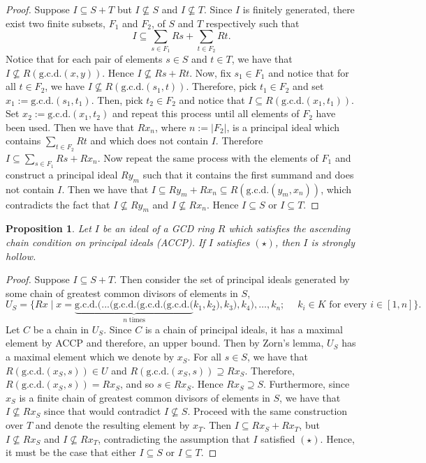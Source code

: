 \documentclass[11pt,english]{amsart}
\newtheorem{proposition}[theorem]{Proposition}
\theoremstyle{definition}
\numberwithin{equation}{section}
\theoremstyle{remark}
\begin{document}
\begin{proof}
    Suppose $I\subseteq S+T$ but $I\not\subseteq S$ and $I\not\subseteq T$. Since $I$ is finitely generated, there exist two finite subsets, $F_1$ and $F_2$, of $S$ and $T$ respectively such that \[I\subseteq \sum_{s\in F_1}Rs+ \sum_{t\in F_2}Rt.\] Notice that for each pair of elements $s\in S$ and $t\in T$, we have that $I\not\subseteq R(\mathrm{g.c.d.}(x,y))$. Hence $I\not\subseteq Rs+Rt$. Now, fix $s_1\in F_1$ and notice that for all $t\in F_2$, we have $I\not\subseteq R(\mathrm{g.c.d.}(s_1,t))$. Therefore, pick $t_1\in F_2$ and set $x_1:=\mathrm{g.c.d.}(s_1,t_1).$ Then, pick $t_2\in F_2$ and notice that $I\subseteq R(\mathrm{g.c.d.}(x_1,t_1))$. Set $x_2:=\mathrm{g.c.d.}(x_1,t_2)$ and repeat this process until all elements of $F_2$ have been used. Then we have that $Rx_n$, where $n:=|F_2|$, is a principal ideal which contains $\sum_{t\in F_2}Rt$ and which does not contain $I$. Therefore $I\subseteq \sum_{s\in F_1}Rs+Rx_n$. Now repeat the same process with the elements of $F_1$ and construct a principal ideal $Ry_m$ such that it contains the first summand and does not contain $I$. Then we have that $I\subseteq Ry_m+Rx_n\subseteq R(\mathrm{g.c.d.}(y_m,x_n))$, which contradicts the fact that $I\not\subseteq Ry_m$ and $I\not\subseteq Rx_n$. Hence $I\subseteq S$ or $I\subseteq T$.
\end{proof}

\begin{proposition}
    Let $I$ be an ideal of a GCD ring $R$ which satisfies the ascending chain condition on principal ideals (ACCP). If $I$ satisfies $(\star)$, then $I$ is strongly hollow.
\end{proposition}

\begin{proof}
    Suppose $I\subseteq S+T$. Then consider the set of principal ideals generated by some chain of greatest common divisors of elements in $S$, \[U_S=\{Rx \;|\; x=\underbrace{\mathrm{g.c.d.}(...(\mathrm{g.c.d.}(\mathrm{g.c.d.}(\mathrm{g.c.d.}( }_{n\;\text{times}}k_1, k_2 ),k_3),k_4),\dots,k_n ;\quad\; k_i\in K \text{ for every } i\in[1,n]\}.\] Let $C$ be a chain in $U_S$. Since $C$ is a chain of principal ideals, it has a maximal element by ACCP and therefore, an upper bound. Then by Zorn's lemma, $U_S$ has a maximal element which we denote by $x_S$. For all $s\in S$, we have that $R(\mathrm{g.c.d.}(x_S,s))\in U$ and $R(\mathrm{g.c.d.}(x_S,s))\supseteq Rx_S$. Therefore, $R(\mathrm{g.c.d.}(x_S,s))=Rx_S$, and so $s\in Rx_S$. Hence $Rx_S\supseteq S$. Furthermore, since $x_S$ is a finite chain of greatest common divisors of elements in $S$, we have that $I\not\subseteq Rx_S$ since that would contradict $I\not\subseteq S$. Proceed with the same construction over $T$ and denote the resulting element by $x_T$. Then $I\subseteq Rx_S+Rx_T$, but $I\not\subseteq Rx_S$ and $I\not\subseteq Rx_T$, contradicting the assumption that $I$ satisfied $(\star)$. Hence, it must be the case that either $I\subseteq S$ or $I\subseteq T$.  
\end{proof}
\end{document}

